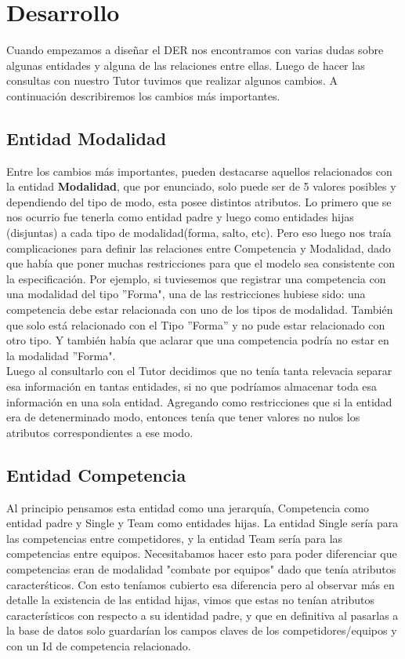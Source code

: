 \section{Desarrollo}

Cuando empezamos a diseñar el DER nos encontramos con varias dudas sobre algunas entidades y alguna de las
relaciones entre ellas. Luego de hacer las consultas con nuestro Tutor tuvimos que realizar algunos cambios. A continuaci\'on describiremos los cambios m\'as importantes.

\subsection{Entidad Modalidad}

Entre los cambios más importantes, pueden destacarse aquellos relacionados con la entidad \textbf{Modalidad}, que por enunciado, solo puede ser de 5 valores posibles y dependiendo del tipo de modo, esta posee distintos atributos. Lo primero que se nos ocurrio fue tenerla como entidad padre y luego como entidades hijas (disjuntas) a cada tipo de modalidad(forma, salto, etc).
Pero eso luego nos tra\'ia complicaciones para definir las relaciones entre Competencia y Modalidad, dado que había que poner muchas restricciones para que el modelo sea consistente con la especificación. 
Por ejemplo, si tuviesemos que registrar una competencia con una modalidad del tipo ''Forma", una de las restricciones hubiese sido: una competencia debe estar relacionada con uno de los tipos de modalidad. También que solo está relacionado con el Tipo ''Forma'' y no pude estar relacionado con otro tipo. 
Y también había que aclarar que una competencia podría no estar en la modalidad ''Forma". \\

Luego al consultarlo con el Tutor decidimos que no tenía tanta relevacia separar esa información en tantas entidades, si no que podr\'iamos almacenar toda esa información en una sola entidad. Agregando como restricciones que si la entidad era de detenerminado modo, entonces tenía que tener valores no nulos los atributos correspondientes a ese modo. \\

\subsection{Entidad Competencia}


Al principio pensamos esta entidad como una jerarqu\'ia, Competencia como entidad padre y Single y Team como entidades hijas. La entidad Single ser\'ia para las competencias entre competidores, y la entidad Team ser\'ia para las competencias entre equipos. Necesitabamos hacer esto para poder diferenciar que competencias eran de modalidad "combate por equipos" dado que tenía atributos caracter\'sticos. Con esto teníamos cubierto esa diferencia pero al observar m\'as en detalle la existencia de las entidad hijas, vimos que estas no tenían atributos característicos con respecto a su identidad padre, y que en definitiva al pasarlas a la base de datos solo guardar\'ian los campos claves de los competidores/equipos y con un Id de competencia relacionado.\\

